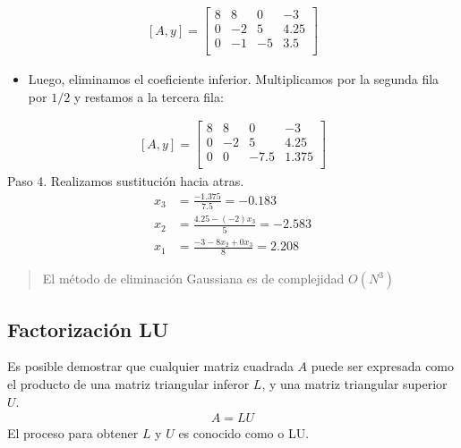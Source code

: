 \documentclass[letterpaper,10pt,english]{jupyterBook}
\begin{document}
\begin{equation*}
\begin{split}
[A, y]  = \begin{bmatrix}
8 & 8 & 0 & -3\\
0 & -2 & 5 & 4.25\\
0 & -1 & -5 & 3.5\\
\end{bmatrix}\end{split}
\end{equation*}\begin{itemize}
\item {} 
\sphinxAtStartPar
Luego, eliminamos el coeficiente inferior.  Multiplicamos por la segunda fila por \(1/2\) y restamos a la tercera fila:

\end{itemize}
\begin{equation*}
\begin{split}
[A, y]  = \begin{bmatrix}
8 & 8 & 0 & -3\\
0 & -2 & 5 & 4.25\\
0 & 0 & -7.5 & 1.375\\
\end{bmatrix}\end{split}
\end{equation*}
\sphinxAtStartPar
Paso 4. Realizamos sustitución hacia atras.
\begin{align*}
x_3 &= \frac{-1.375}{7.5}=-0.183 \\
x_2 &= \frac{4.25 - (-2)x_3}{5} = -2.583 \\
x_1 &= \frac{-3 - 8x_2 + 0x_3}{8} = 2.208
\end{align*}\begin{quote}

\sphinxAtStartPar
El método de eliminación Gaussiana es de complejidad \(O(N^3)\)
\end{quote}


\subsection{Factorización LU}
\label{\detokenize{1.2-Algebra_lineal/1.2-Algebra_lineal:factorizacion-lu}}
\sphinxAtStartPar
Es posible demostrar que cualquier matriz cuadrada \(A\) puede ser expresada como el producto de una matriz triangular inferor \(L\), y una matriz triangular superior \(U\).
\begin{equation*}
\begin{split}A = LU\end{split}
\end{equation*}
\sphinxAtStartPar
El proceso para obtener \(L\) y \(U\) es conocido como  o  LU. 
\end{document}

